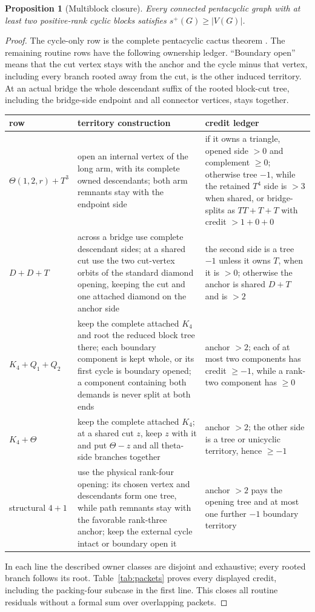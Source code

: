 \documentclass[11pt]{article}
\newtheorem{proposition}[theorem]{Proposition}
\theoremstyle{remark}
\newcommand{\spn}{s^+}
\begin{document}
\begin{proposition}[Multiblock closure]\label{prop:multi}
Every connected pentacyclic graph with at least two positive-rank cyclic
blocks satisfies $\spn(G)\ge|V(G)|$.
\end{proposition}
\begin{proof}
The cycle-only row is the complete pentacyclic cactus theorem
\cite{PentacyclicCactus}.  The remaining routine rows have the following
ownership ledger.  ``Boundary open'' means that the cut vertex stays with the
anchor and the cycle minus that vertex, including every branch rooted away
from the cut, is the other induced territory.  At an actual bridge the whole
descendant suffix of the rooted block-cut tree, including the bridge-side
endpoint and all connector vertices, stays together.
\begin{center}
\small
\begin{tabular}{p{2.5cm}p{4.7cm}p{5.9cm}}
\toprule
row&territory construction&credit ledger\\\midrule
$\Theta(1,2,r)+T^3$&open an internal vertex of the long arm, with its complete
owned descendants; both arm remnants stay with the endpoint side&if it owns a
triangle, opened side $>0$ and complement $\ge0$; otherwise tree $-1$, while
the retained $T^4$ side is $>3$ when shared, or bridge-splits as $TT+T+T$ with
credit $>1+0+0$\\
$D+D+T$&across a bridge use complete descendant sides; at a shared cut use the
two cut-vertex orbits of the standard diamond opening, keeping the cut and one
attached diamond on the anchor side&the second side is a tree $-1$ unless it
owns $T$, when it is $>0$; otherwise the anchor is shared $D+T$ and is $>2$\\
$K_4+Q_1+Q_2$&keep the complete attached $K_4$ and root the reduced block tree
there; each boundary component is kept whole, or its first cycle is boundary
opened; a component containing both demands is never split at both ends&anchor
$>2$; each of at most two components has credit $\ge-1$, while a rank-two
component has $\ge0$\\
$K_4+\Theta$&keep the complete attached $K_4$; at a shared cut $z$, keep $z$
with it and put $\Theta-z$ and all theta-side branches together&anchor $>2$;
the other side is a tree or unicyclic territory, hence $\ge-1$\\
structural $4+1$&use the physical rank-four opening: its chosen vertex and
descendants form one tree, while path remnants stay with the favorable
rank-three anchor; keep the external cycle intact or boundary open it&anchor
$>2$ pays the opening tree and at most one further $-1$ boundary territory\\
\bottomrule
\end{tabular}
\end{center}
In each line the described owner classes are disjoint and exhaustive; every
rooted branch follows its root.  Table~\ref{tab:packets} proves every displayed
credit, including the packing-four subcase in the first line.  This closes all
routine residuals without a formal sum over overlapping packets.


\end{proof}
\end{document}
